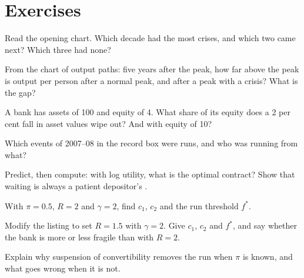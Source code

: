 \section{Exercises}\label{sec:b2:banks-and-crises:exercises}

\begin{exercise}[$\star$]\label{exo:b2:banks-and-crises:1}
Read the opening chart. Which decade had the most crises, and which two came next? Which three had none?
\end{exercise}

\begin{exercise}[$\star$]\label{exo:b2:banks-and-crises:2}
From the chart of output paths: five years after the peak, how far above the peak is output per person after a normal peak,
and after a peak with a crisis? What is the gap?
\end{exercise}

\begin{exercise}[$\star$]\label{exo:b2:banks-and-crises:3}
A bank has assets of 100 and equity of 4. What share of its equity does a 2 per cent fall in asset values wipe out? And with
equity of 10?
\end{exercise}

\begin{exercise}[$\star$]\label{exo:b2:banks-and-crises:4}
Which events of 2007--08 in the record box were runs, and who was running from what?
\end{exercise}

\begin{exercise}[$\star\star$]\label{exo:b2:banks-and-crises:5}
Predict, then compute: with log utility, what is the optimal contract? Show that waiting is always a patient depositor's
.
\end{exercise}

\begin{exercise}[$\star\star$]\label{exo:b2:banks-and-crises:6}
With $\pi = 0.5$, $R = 2$ and $\gamma = 2$, find $c_1$, $c_2$ and the run threshold $f^*$.
\end{exercise}

\begin{exercise}[$\star\star$]\label{exo:b2:banks-and-crises:7}
Modify the listing to set $R = 1.5$ with $\gamma = 2$. Give $c_1$, $c_2$ and $f^*$, and say whether the bank is more or less
fragile than with $R = 2$.
\end{exercise}

\begin{exercise}[$\star\star$]\label{exo:b2:banks-and-crises:8}
Explain why suspension of convertibility removes the run when $\pi$ is known, and what goes wrong when it is not.
\end{exercise}

